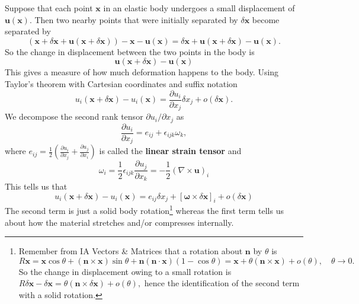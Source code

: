 \begin{example}
    Suppose that each point $\mathbf{x}$ in an elastic body undergoes a small displacement of $\mathbf{u}(\mathbf{x})$. Then two nearby points that were initially separated by $\delta \mathbf{x}$ become separated by
    \[
    (\mathbf{x}+\delta \mathbf{x}+\mathbf{u}(\mathbf{x}+\delta \mathbf{x}))-\mathbf{x}-\mathbf{u}(\mathbf{x})=\delta \mathbf{x}+\mathbf{u}(\mathbf{x}+\delta \mathbf{x})-\mathbf{u}(\mathbf{x}).
    \]
    So the change in displacement between the two points in the body is
    \[
    \mathbf{u}(\mathbf{x}+\delta \mathbf{x})-\mathbf{u}(\mathbf{x})
    \]
    This gives a measure of how much deformation happens to the body. Using Taylor's theorem with Cartesian coordinates and suffix notation
    \[
    u_{i}(\mathbf{x}+\delta \mathbf{x})-u_{i}(\mathbf{x})=\frac{\partial u_{i}}{\partial x_{j}} \delta x_{j}+o(\delta \mathbf{x}).
    \]
    We decompose the second rank tensor $\partial u_{i} / \partial x_{j}$ as
    \[
    \frac{\partial u_{i}}{\partial x_{j}}=e_{i j}+\epsilon_{i j k} \omega_{k},
    \]
    where $e_{i j}=\frac{1}{2}\left(\frac{\partial u_{i}}{\partial x_{j}}+\frac{\partial u_{j}}{\partial x_{i}}\right)$ is called the \textbf{linear strain tensor} and
    \[
    \omega_{i}=\frac{1}{2} \epsilon_{i j k} \frac{\partial u_{j}}{\partial x_{k}}=-\frac{1}{2}(\nabla \times \mathbf{u})_{i}
    \]
    This tells us that
    \[
    u_{i}(\mathbf{x}+\delta \mathbf{x})-u_{i}(\mathbf{x})=e_{i j} \delta x_{j}+[\boldsymbol{\omega} \times \delta \mathbf{x}]_{i}+o(\delta \mathbf{x})
    \]
    The second term is just a solid body rotation\footnote{Remember from IA Vectors \& Matrices that a rotation about $\mathbf{n}$ by $\theta$ is
    \[
    R \mathbf{x}=\mathbf{x} \cos \theta+(\mathbf{n} \times \mathbf{x}) \sin \theta+\mathbf{n}(\mathbf{n} \cdot \mathbf{x})(1-\cos \theta)=\mathbf{x}+\theta(\mathbf{n} \times \mathbf{x})+o(\theta), \quad \theta \rightarrow 0.
    \]
    So the change in displacement owing to a small rotation is $R \delta \mathbf{x}-\delta \mathbf{x}=\theta(\mathbf{n} \times \delta \mathbf{x})+o(\theta),$ hence the
    identification of the second term with a solid rotation.} whereas the first term tells us about how
    the material stretches and/or compresses internally.
\end{example}

